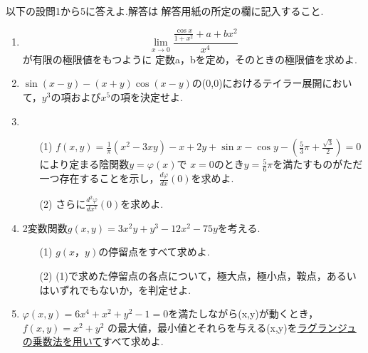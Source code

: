 \documentclass{jarticle}
\begin{document}
以下の設問1から5に答えよ.解答は 解答用紙の所定の欄に記入すること.
\begin{enumerate}
    \item \[\lim_{x\to 0}\frac{\frac{\cos x}{1+x^{2}}+a+bx^{2}}{x^{4}}\]
        が有限の極限値をもつように
	    定数a，bを定め，そのときの極限値を求めよ.
    \item 
        \(\sin(x-y)-(x+y)\cos(x-y)\)の(0,0)におけるテイラー展開において，\(y^{3}\)の項および\(x^{5}\)の項を決定せよ.
    \item 
    \begin{enumerate}
        \item [(1)]\(f(x,y)=\frac{1}{\pi}(x^{2}-3xy)-x+2y+\sin{x}-\cos{y}-(\frac{5}{3}\pi+\frac{\sqrt{3}}{2})=0
	      	\)により定まる陰関数\(y=\varphi(x)\)で
	      	\(x=0\)のとき\(y=\frac{5}{6}\pi\)を満たすものがただ一つ存在することを示し，\(\frac{d\varphi}{dx}(0)\)を求めよ.
        \item [(2)]さらに\(\frac{d^{2}\varphi}{dx^{2}}(0)\)を求めよ.
    \end{enumerate}
	      
    \item 
    2変数関数\(g(x,y)=3x^{2}y+y^{3}-12x^{2}-75y\)を考える.
    \begin{enumerate} 
        \item [(1)]\(g(x，y)\)の停留点をすべて求めよ.
        \item [(2)](1)で求めた停留点の各点について，極大点，極小点，鞍点，あるいはいずれでもないか，を判定せよ.
    \end{enumerate}
    \item \(\varphi(x,y)=6x^{4}+x^{2}+y^{2}-1=0\)を満たしながら(x,y)が動くとき，\(f(x,y)=x^{2}+y^{2}\)
    の最大値，最小値とそれらを与える(x,y)を\underline{ラグランジュの乗数法を用いて}すべて求めよ.
	\end{enumerate}
\end{document}
